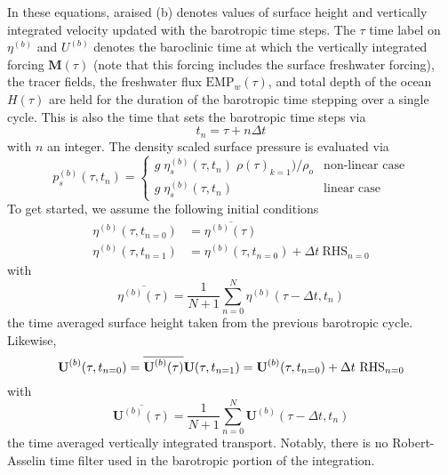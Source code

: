 \documentclass[NEMO_book]{subfiles}
\begin{document}
In these equations, araised (b) denotes values of surface height and vertically integrated velocity updated with the barotropic time steps. The $\tau$ time label on $\eta^{(b)}$ 
and $U^{(b)}$ denotes the baroclinic time at which the vertically integrated forcing $\textbf{M}(\tau)$ (note that this forcing includes the surface freshwater forcing), the tracer fields, the freshwater flux $\text{EMP}_w(\tau)$, and total depth of the ocean $H(\tau)$ are held for the duration of the barotropic time stepping over a single cycle. This is also the time 
that sets the barotropic time steps via 
\begin{equation} \label{DYN_spg_ts_t}
t_n=\tau+n\Delta t   
\end{equation}
with $n$ an integer. The density scaled surface pressure is evaluated via 
\begin{equation} \label{DYN_spg_ts_ps}
p_s^{(b)}(\tau,t_{n}) = \begin{cases}
	g \;\eta_s^{(b)}(\tau,t_{n}) \;\rho(\tau)_{k=1}) / \rho_o  &      \text{non-linear case} \\
	g \;\eta_s^{(b)}(\tau,t_{n})  &      \text{linear case} 
	\end{cases}
\end{equation}
To get started, we assume the following initial conditions 
\begin{equation} \label{DYN_spg_ts_eta}
\begin{split}
\eta^{(b)}(\tau,t_{n=0}) &= \overline{\eta^{(b)}(\tau)}
\\
\eta^{(b)}(\tau,t_{n=1}) &= \eta^{(b)}(\tau,t_{n=0}) + \Delta t \ \text{RHS}_{n=0} 
\end{split}
\end{equation}
with 
\begin{equation} \label{DYN_spg_ts_etaF}
 \overline{\eta^{(b)}(\tau)} = \frac{1}{N+1} \sum\limits_{n=0}^N \eta^{(b)}(\tau-\Delta t,t_{n})
\end{equation}
the time averaged surface height taken from the previous barotropic cycle. Likewise, 
\begin{equation} \label{DYN_spg_ts_u}
\textbf{U}^{(b)}(\tau,t_{n=0}) = \overline{\textbf{U}^{(b)}(\tau)}	\\
\\
\textbf{U}(\tau,t_{n=1}) = \textbf{U}^{(b)}(\tau,t_{n=0}) + \Delta t \ \text{RHS}_{n=0}  	
\end{equation}
with 
\begin{equation} \label{DYN_spg_ts_u}
 \overline{\textbf{U}^{(b)}(\tau)} 
 	= \frac{1}{N+1} \sum\limits_{n=0}^N\textbf{U}^{(b)}(\tau-\Delta t,t_{n})
\end{equation}
the time averaged vertically integrated transport. Notably, there is no Robert-Asselin time filter used in the barotropic portion of the integration. 
\end{document}
